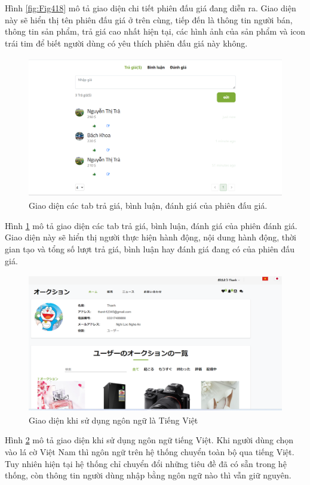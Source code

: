 \documentclass[../DoAn.tex]{subfiles}
\begin{document}
Hình \ref{fig:Fig418} mô tả giao diện chi tiết phiên đấu giá đang diễn ra. Giao diện này sẽ hiển thị tên phiên đấu giá ở trên cùng, tiếp đến là thông tin người bán, thông tin sản phẩm, trả giá cao nhất hiện tại, các hình ảnh của sản phẩm và icon trái tim để biết người dùng có yêu thích phiên đấu giá này không.
\begin{figure}[H]
    \centering
    \includegraphics[width=11.4cm,height=6.20cm]{Hinhve/commentbid.png}
    \caption{Giao diện các tab trả giá, bình luận, đánh giá của phiên đấu giá.}
    \label{fig:Fig419}
\end{figure}
Hình \ref{fig:Fig419} mô tả giao diện các tab trả giá, bình luận, đánh giá của phiên đánh giá. Giao diện này sẽ hiển thị người thực hiện hành động, nội dung hành động, thời gian tạo và tổng số lượt trả giá, bình luận hay đánh giá đang có của phiên đấu giá. 
\begin{figure}[H]
    \centering
    \includegraphics[width=11.4cm,height=6.06cm]{Hinhve/jp.png}
    \caption{Giao diện khi sử dụng ngôn ngữ là Tiếng Việt}
    \label{fig:Fig420}
\end{figure}
Hình \ref{fig:Fig420} mô tả giao diện khi sử dụng ngôn ngữ tiếng Việt. Khi người dùng chọn vào lá cờ Việt Nam thì ngôn ngữ trên hệ thống chuyển toàn bộ qua tiếng Việt. Tuy nhiên hiện tại hệ thống chỉ chuyển đổi những tiêu đề đã có sẵn trong hệ thống, còn thông tin người dùng nhập bằng ngôn ngữ nào thì vẫn giữ nguyên.
\end{document}
